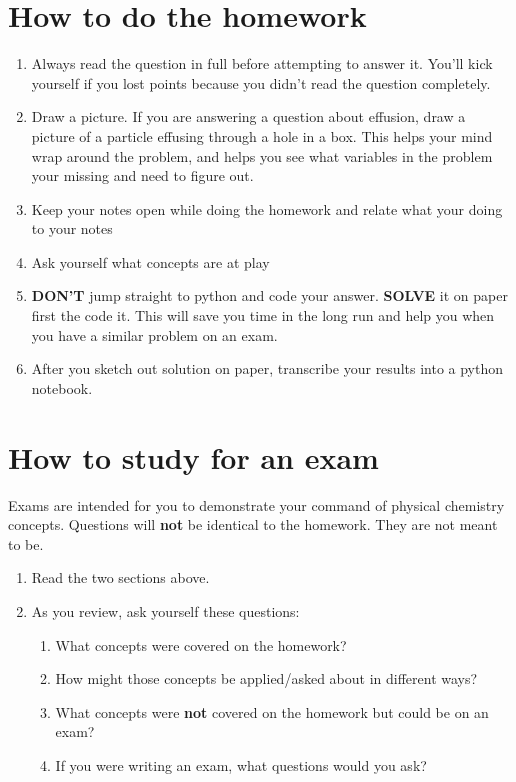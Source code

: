 \documentclass[11pt]{article}
\begin{document}
\section{How to do the homework}
\label{sec:org7a12fa5}
\begin{enumerate}
\item Always read the question in full before attempting to answer it. You'll kick yourself if you lost     
points because you didn't read the question completely.
\item Draw a picture. If you are answering a question about effusion, draw a picture of a particle effusing    
through a hole in a box. This helps your mind wrap around the problem, and helps you see what variables  
in the problem your missing and need to figure out.
\item Keep your notes open while doing the homework and relate what your doing to your notes
\item Ask yourself what concepts are at play
\item \textbf{DON'T} jump straight to python and code your answer. \textbf{SOLVE} it on paper first the code it. This
will save you time in the long run and help you when you have a similar problem on an exam.
\item After you sketch out solution on paper, transcribe your results into a python notebook.
\end{enumerate}


\section{How to study for an exam}
\label{sec:orge44f748}
Exams are intended for you to demonstrate your command of physical chemistry concepts. Questions will \textbf{not} be identical to the homework. They are not meant to be.

\begin{enumerate}
\item Read the two sections above.
\item As you review, ask yourself these questions: 
\begin{enumerate}
\item What concepts were covered on the homework?
\item How might those concepts be applied/asked about in different ways?
\item What concepts were \textbf{not} covered on the homework but could be on an exam?
\item If you were writing an exam, what questions would you ask?
\end{enumerate}
\end{enumerate}
\end{document}
